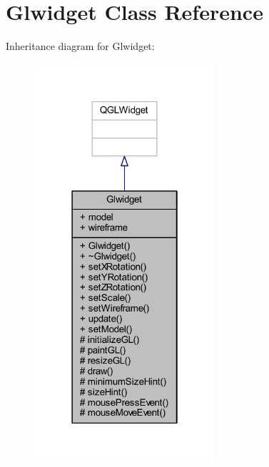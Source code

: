 \hypertarget{class_glwidget}{}\section{Glwidget Class Reference}
\label{class_glwidget}


Inheritance diagram for Glwidget\+:
\nopagebreak
\begin{figure}[H]
\begin{center}
\leavevmode
\includegraphics[width=190pt]{class_glwidget__inherit__graph}
\end{center}
\end{figure}


